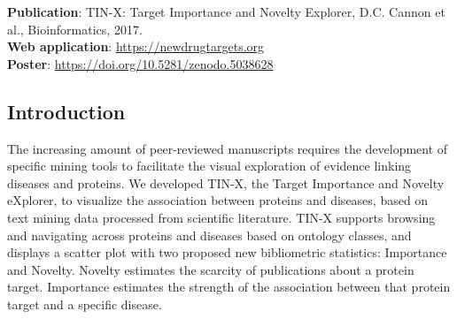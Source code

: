 \textbf{Publication}: TIN-X: Target Importance and Novelty Explorer, D.C. Cannon et al., Bioinformatics, 2017\cite{Cannon2017-af}.\\
\textbf{Web application}: \href{https://newdrugtargets.org}{https://newdrugtargets.org}\\
\textbf{Poster}: \href{https://doi.org/10.5281/zenodo.5038628}{https://doi.org/10.5281/zenodo.5038628}

\subsection{Introduction}

The increasing amount of peer-reviewed manuscripts requires the development of specific mining tools to facilitate the visual exploration of evidence linking diseases and proteins. We developed TIN-X, the Target Importance and Novelty eXplorer, to visualize the association between proteins and diseases, based on text mining data processed from scientific literature. TIN-X supports browsing and navigating across proteins and diseases based on ontology classes, and displays a scatter plot with two proposed new bibliometric statistics: Importance and Novelty. Novelty estimates the scarcity of publications about a protein target. Importance estimates the strength of the association between that protein target and a specific disease.

